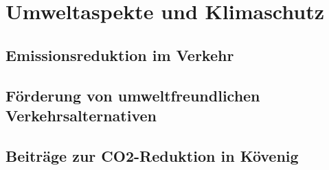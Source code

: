 \section{Umweltaspekte und Klimaschutz}
\subsection{Emissionsreduktion im Verkehr}
\subsection{Förderung von umweltfreundlichen Verkehrsalternativen}
\subsection{Beiträge zur CO2-Reduktion in Kövenig}

